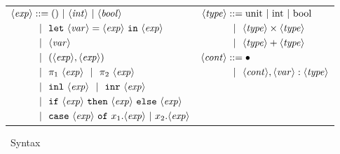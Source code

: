 \begin{figure}
\caption{\ellTarget~Syntax}
\label{fig:ellTargetSyntax}
\centering
\begin{tabular}{ll} 
$\begin{aligned}
\expr &::= ()~|~\inte~|~\bool \\
&\gbar \letin{\var}{\expr}{\expr} \\
&\gbar \var \\
&\gbar (\expr, \expr) \\
&\gbar \pi_1~\expr \gbar \pi_2~\expr \\
&\gbar \inl~\expr \gbar \inr~\expr \\
&\gbar \ifthen {\expr}{\expr}{\expr}  \\
&\gbar \caseof {\expr}{x_1.\expr}{x_2.\expr} 
\end{aligned} $
& 
$\begin{aligned}
\type &::=  \rmunit~|~\text{int}~|~\text{bool} \\
&\gbar \type \times \type  \\
&\gbar \type + \type 
\\
\context &::= \emptyC \\
&\gbar \context, \var : \type
\\ \\ \\ \\
\end{aligned} $
\end{tabular}
\end{figure}


